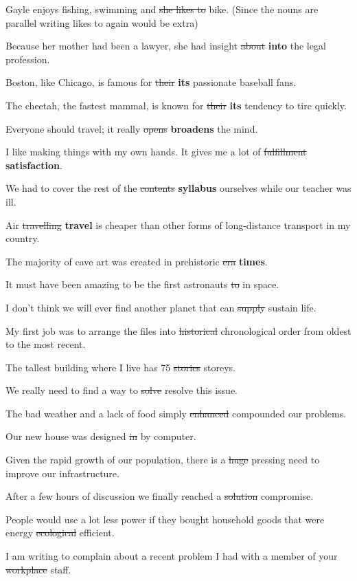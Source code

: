 \documentclass[12pt, a4paper]{ximera}
\begin{document}
Gayle enjoys fishing, swimming and \sout{she likes to} bike. (Since the nouns are parallel writing likes to again would be extra)

Because her mother had been a lawyer, she had insight \sout{about} \textbf{into} the legal profession.

Boston, like Chicago, is famous for \sout{their} \textbf{its} passionate baseball fans.

The cheetah, the fastest mammal, is known for \sout{their} \textbf{its} tendency to tire quickly. 

Everyone should travel; it really \sout{opens} \textbf{broadens} the mind.

I like making things with my own hands. It gives me a lot of \sout{fulfillment} \textbf{satisfaction}.

We had to cover the rest of the \sout{contents} \textbf{syllabus} ourselves while our teacher was ill.

Air \sout{travelling} \textbf{travel} is cheaper than other forms of long-distance transport in my country.

The majority of cave art was created in prehistoric \sout{era} \textbf{times}.

It must have been amazing to be the first astronauts \sout{to} in space.

I don't think we will ever find another planet that can \sout{supply} sustain life.

My first job was to arrange the files into \sout{historical} chronological order from oldest to the most recent.

The tallest building where I live has 75 \sout{stories} storeys.

We really need to find a way to \sout{solve} resolve this issue.

The bad weather and a lack of food simply \sout{enhanced} compounded our problems.

Our new house was designed \sout{in} by computer.

Given the rapid growth of our population, there is a \sout{huge} pressing need to improve our infrastructure.

After a few hours of discussion we finally reached a \sout{solution} compromise.

People would use a lot less power if they bought household goods that were energy \sout{ecological} efficient.

I am writing to complain about a recent problem I had with a member of your \sout{workplace} staff.
\end{document}
